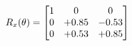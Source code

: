 \documentclass[preview]{standalone}
\begin{document}
\begin{align*}
\special{dvisvgm:raw <g id='unique000'>}R_{x}(\theta) = \begin{bmatrix}1 & 0 & 0 \\0 & +0.85 & -0.53 \\0 & +0.53 & +0.85\end{bmatrix}\special{dvisvgm:raw </g>}
\end{align*}
\end{document}

